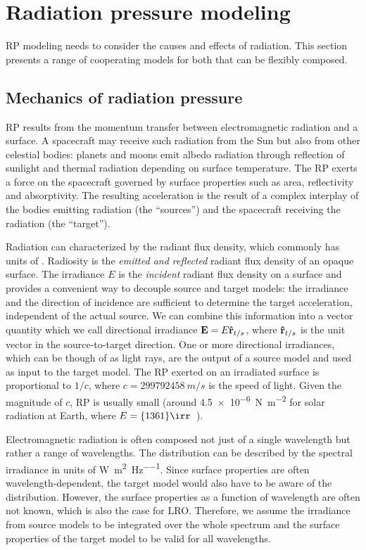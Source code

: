 \section{Radiation pressure modeling}
\gls{RP} modeling needs to consider the causes and effects of radiation. This section presents a range of cooperating models for both that can be flexibly composed.


\subsection{Mechanics of radiation pressure}
\label{subsec:general-rp-mechanics}

\gls{RP} results from the momentum transfer between electromagnetic radiation and a surface. A spacecraft may receive such radiation from the Sun but also from other celestial bodies: planets and moons emit albedo radiation through reflection of sunlight and thermal radiation depending on surface temperature. The \gls{RP} exerts a force on the spacecraft governed by surface properties such as area, reflectivity and absorptivity. The resulting acceleration is the result of a complex interplay of the bodies emitting radiation (the ``sources'') and the spacecraft receiving the radiation (the ``target'').

Radiation can characterized by the radiant flux density, which commonly has units of \unit{\irr}. Radiosity is the \emph{emitted and reflected} radiant flux density of an opaque surface. The irradiance $E$ is the \emph{incident} radiant flux density on a surface and provides a convenient way to decouple source and target models: the irradiance and the direction of incidence are sufficient to determine the target acceleration, independent of the actual source. We can combine this information into a vector quantity which we call directional irradiance $\vb E = E \vu r_{t/s}$, where $\vu r_{t/s}$ is the unit vector in the source-to-target direction. One or more directional irradiances, which can be though of as light rays, are the output of a source model and used as input to the target model. The \gls{RP} exerted on an irradiated surface is proportional to $1/c$, where $c = \qty{299792458}{m/s}$ is the speed of light. Given the magnitude of $c$, \gls{RP} is usually small (around \qty{4.5e-6}{\N\per\m\squared} for solar radiation at Earth, where $E=\qty{1361}{\irr}$~\cite{Kopp2011}).

Electromagnetic radiation is often composed not just of a single wavelength but rather a range of wavelengths. The distribution can be described by the spectral irradiance in units of \unit{\W\per\square\m\per\Hz}. Since surface properties are often wavelength-dependent, the target model would also have to be aware of the distribution. However, the surface properties as a function of wavelength are often not known, which is also the case for \gls{LRO}. Therefore, we assume the irradiance from source models to be integrated over the whole spectrum and the surface properties of the target model to be valid for all wavelengths.




